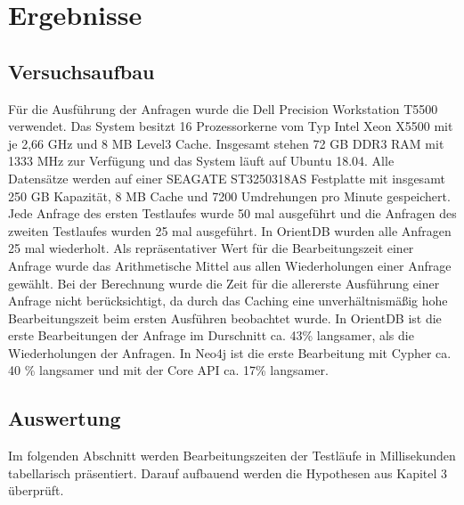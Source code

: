
\chapter{Ergebnisse} %

\label{Kaptiel4} %

\section{Versuchsaufbau}
Für die Ausführung der Anfragen wurde die Dell Precision Workstation T5500 verwendet. Das System besitzt 16 Prozessorkerne vom Typ Intel Xeon  X5500 mit je 2,66 GHz und  8 MB Level3 Cache. Insgesamt stehen 72 GB DDR3 RAM mit 1333 MHz zur Verfügung und das System läuft auf Ubuntu 18.04. Alle Datensätze werden auf einer SEAGATE ST3250318AS Festplatte mit insgesamt 250 GB Kapazität, 8 MB Cache und 7200 Umdrehungen pro Minute gespeichert.\newline
 Jede Anfrage des ersten Testlaufes wurde 50 mal ausgeführt und die Anfragen des zweiten Testlaufes wurden 25 mal ausgeführt. In OrientDB wurden alle Anfragen 25 mal wiederholt. Als repräsentativer Wert für die Bearbeitungszeit einer Anfrage  wurde das Arithmetische Mittel aus allen Wiederholungen einer Anfrage gewählt. Bei der Berechnung wurde die Zeit für die allererste Ausführung einer Anfrage nicht berücksichtigt, da durch das Caching eine unverhältnismäßig hohe Bearbeitungszeit beim ersten Ausführen beobachtet wurde. In OrientDB ist die erste Bearbeitungen der Anfrage im Durschnitt ca. 43\% langsamer, als die Wiederholungen  der Anfragen. In Neo4j ist die erste Bearbeitung mit Cypher ca. 40 \% langsamer und mit der Core API ca. 17\% langsamer.  
\section{Auswertung}
Im folgenden Abschnitt werden Bearbeitungszeiten der Testläufe in Millisekunden tabellarisch präsentiert.  Darauf aufbauend werden die Hypothesen aus Kapitel 3 überprüft.  
